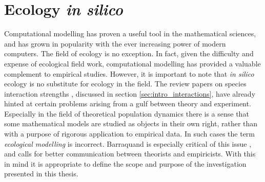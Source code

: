 


\section{Ecology \emph{in silico}}
\label{sec:intro_computers}


Computational modelling has proven a useful tool in the mathematical sciences, and has grown in popularity with the ever increasing power of modern computers. The field of ecology is no exception. In fact, given the difficulty and expense of ecological field work, computational modelling has provided a valuable complement to empirical studies. However, it is important to note that \emph{in silico} ecology is no substitute for ecology in the field. The review papers on species interaction strengths \cite{berlow2004interaction,wootton2005measurement}, discussed in section \ref{sec:intro_interactions}, have already hinted at certain problems arising from a gulf between theory and experiment. Especially in the field of theoretical population dynamics there is a sense that some mathematical models are studied as objects in their own right, rather than with a purpose of rigorous application to empirical data. In such cases the term \emph{ecological modelling} is incorrect. Barraquand is especially critical of this issue \cite{barraquand2014functional}, and calls for better communication between theorists and empiricists. With this in mind it is appropriate to define the scope and purpose of the investigation presented in this thesis. 

